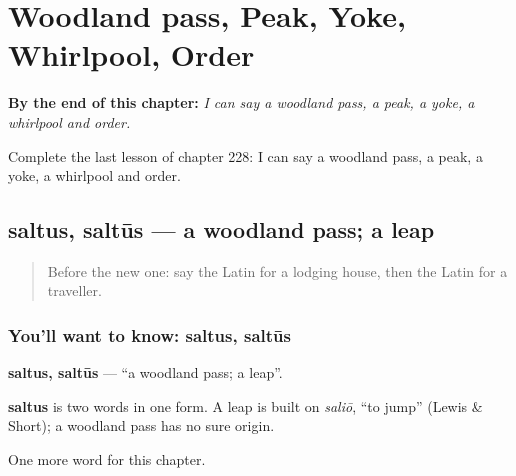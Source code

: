 
\chapter{Woodland pass, Peak, Yoke, Whirlpool, Order}
\label{ch:la-woodland-pass-peak-yoke-whirlpool-order}

\begin{chapteropening}
\textbf{By the end of this chapter:} \emph{I can say a woodland pass, a peak, a yoke, a whirlpool and order.}

Complete the last lesson of chapter 228: I can say a woodland pass, a peak, a yoke, a whirlpool and order.
\end{chapteropening}

\section[saltus, saltūs]{saltus, saltūs — a woodland pass; a leap}

\label{lesson:LA-C228-saltus}



\begin{quote}
Before the new one: say the Latin for a lodging house, then the Latin for a traveller.
\end{quote}

\subsection*{You'll want to know: saltus, saltūs}
\textbf{saltus, saltūs} — \textquotedblleft{}a woodland pass; a leap\textquotedblright{}.

\begin{cousinweb}
\textbf{saltus} is two words in one form. A leap is built on \emph{saliō}, \textquotedblleft{}to jump\textquotedblright{} (Lewis \& Short); a woodland pass has no sure origin.
\end{cousinweb}

\begin{grammarlens}[title={What you've built}]
One more word for this chapter.
\end{grammarlens}

